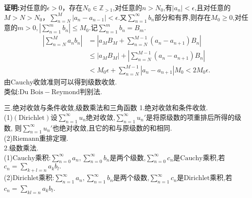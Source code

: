 \documentclass[UTF8]{ctexbeamer}
\begin{document}
    \begin{frame}
        \textbf{证明:}对任意的$\epsilon>0$，存在$N_0\in\mathbb{Z}_{>1}$,对任意的$n>N_0$,有$|a_n|<\epsilon$,且对任意的$M>N>N_0$，$\sum\limits_{n=N}^{M}|a_n-a_{n-1}|<\epsilon$.又$\sum\limits_{n=1}^{\infty}b_n$部分和有界,则存在$M_0\geqslant 0$,对任意的$m>0,\left|\sum\limits_{n=1}^{m}b_n\right|\leqslant M_0$.记$\sum\limits_{n=1}^{m}b_n=B_m$.
        $$
        \begin{aligned}
            \left|\sum_{n=N}^{M}a_nb_n\right|&=\left|a_MB_M+\sum_{n=N}^{M-1}(a_n-a_{n+1})B_n\right|\\
            &\leqslant|a_MB_M|+\left|\sum_{n=N}^{M-1}(a_n-a_{n+1})B_n\right|\\
            &<M_0\epsilon+\sum_{n=N}^{M-1}|a_n-a_{n+1}|M_0<2M_0\epsilon.
        \end{aligned}
        $$
        由$\mathrm{Cauchy}$收敛准则可以得到级数收敛.
        \pause
        \\类似:$\mathrm{Du\;Bois-Reymond}$判别法.
    \end{frame}
    \begin{frame}{三.绝对收敛与条件收敛,级数乘法和三角函数}
        1.绝对收敛和条件收敛.
        \\\hspace*{20pt}(1)$(\mathrm{Dirichlet})$设$\sum\limits_{n=1}^{\infty}u_n$绝对收敛,$\sum\limits_{n=1}^{\infty}u_n'$是将原级数的项重排后所得的级数,
        则$\sum\limits_{n=1}^{\infty}u_n'$也绝对收敛,且它的和与原级数的和相同.
        \\\hspace*{20pt}(2)$\mathrm{Riemann}$重排定理.
        \\2.级数乘法.
        \\\hspace*{20pt}(1)$\mathrm{Cauchy}$乘积:$\sum\limits_{n=0}^{\infty}a_n,\sum\limits_{n=0}^{\infty}b_n$是两个级数,$\sum\limits_{n=0}^{\infty}c_n$是$\mathrm{Cauchy}$乘积,若$c_n=\sum\limits_{k+l=n}a_kb_l.$
        \\\hspace*{20pt}(2)$\mathrm{Dirichlet}$乘积:$\sum\limits_{n=1}^{\infty}a_n,\sum\limits_{n=1}^{\infty}b_n$是两个级数,$\sum\limits_{n=1}^{\infty}c_n$是$\mathrm{Dirichlet}$乘积,若$c_n=\sum\limits_{kl=n}a_kb_l$.
    \end{frame}
\end{document}
